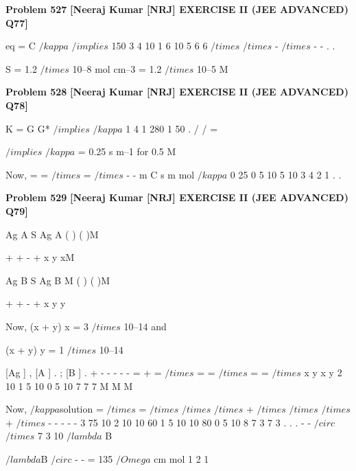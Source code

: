 \begin{problembox}
\textbf{Problem 527} \hfill \textbf{[Neeraj Kumar [NRJ] EXERCISE II (JEE ADVANCED) Q77]}
\label{q:ext-nrj_all_questions-527}

 eq = C
$/kappa$ $/implies$ 150
3 4
10
1 6
10
5
6
6
$/times$
$/times$
-
$/times$
-
-
.
.
 
   S = 1.2 $/times$ 10--8 mol cm--3 = 1.2 $/times$ 10--5 M
\end{problembox}

\begin{problembox}
\textbf{Problem 528} \hfill \textbf{[Neeraj Kumar [NRJ] EXERCISE II (JEE ADVANCED) Q78]}
\label{q:ext-nrj_all_questions-528}

K = G   G* $/implies$ $/kappa$
1 4
1 280
1 50
.
/
/
=
 
 
 $/implies$ $/kappa$ = 0.25 s m--1 for 0.5 M
 
 Now,  
=
=
$/times$
=
$/times$
-
-
m
C
s m mol
$/kappa$
0 25
0 5 10
5 10
3
4
2
1
.
.
\end{problembox}

\begin{problembox}
\textbf{Problem 529} \hfill \textbf{[Neeraj Kumar [NRJ] EXERCISE II (JEE ADVANCED) Q79]}
\label{q:ext-nrj_all_questions-529}

Ag A S
Ag
A
( )
(
)M

  


 



+
+
-
+
x
y
xM
 
 
 
Ag B S
Ag
B
M
( )
(
)M

  


 



+
+
-
+
x
y
y
 
 Now, (x + y)   x = 3 $/times$ 10--14 and 
 
           (x + y)   y = 1 $/times$ 10--14
 
   [Ag ]
,
[A ]
.
;
[B ]
.
+
-
-
-
-
-
=
+
=
$/times$
=
=
$/times$
=
=
$/times$
x
y
x
y
2
10
1 5 10
0 5 10
7
7
7
M
M
M
 
 
 Now, 
$/kappa$solution =
$/times$
=
$/times$
$/times$
$/times$
+
$/times$
$/times$
$/times$
+
$/times$
-
-
-
-
-
3 75 10
2 10
10
60
1 5 10
10
80
0 5 10
8
7
3
7
3
.
.
.
-
-
$/circ$
$/times$
7
3
10
$/lambda$ B
 
 
   $/lambda$B
$/circ$
-
-
= 135 $/Omega$
cm mol
1
2
1
\end{problembox}


